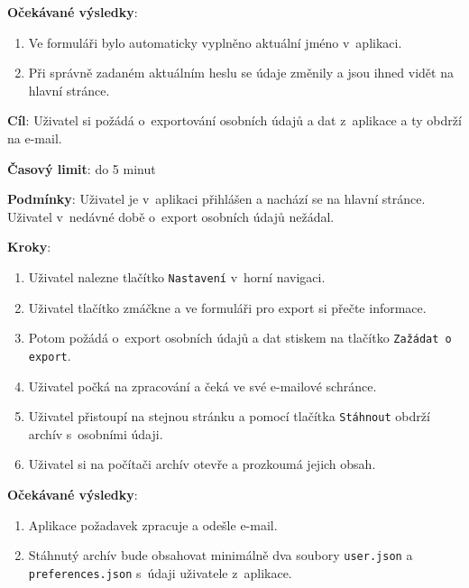 \textbf{Očekávané výsledky}:

\begin{enumerate}[leftmargin=1.4cm]
    \item Ve formuláři bylo automaticky vyplněno aktuální jméno v~aplikaci.
    \item Při správně zadaném aktuálním heslu se údaje změnily a jsou ihned vidět na hlavní stránce.
\end{enumerate}





\vspace{1em}

\textbf{Cíl}: Uživatel si požádá o~exportování osobních údajů a dat z~aplikace a ty obdrží na e-mail.

\textbf{Časový limit}: do 5 minut

\textbf{Podmínky}: Uživatel je v~aplikaci přihlášen a nachází se na hlavní stránce. Uživatel v~nedávné době o~export osobních údajů nežádal.

\textbf{Kroky}:

\begin{enumerate}[leftmargin=1.4cm]
    \item Uživatel nalezne tlačítko \verb|Nastavení| v~horní navigaci.
    \item Uživatel tlačítko zmáčkne a ve formuláři pro export si přečte informace.
    \item Potom požádá o~export osobních údajů a dat stiskem na tlačítko \verb|Zažádat o export|.
    \item Uživatel počká na zpracování a čeká ve své e-mailové schránce.
    \item Uživatel přistoupí na stejnou stránku a pomocí tlačítka \verb|Stáhnout| obdrží archív s~osobními údaji.
    \item Uživatel si na počítači archív otevře a prozkoumá jejich obsah.
\end{enumerate}

\textbf{Očekávané výsledky}:

\begin{enumerate}[leftmargin=1.4cm]
    \item Aplikace požadavek zpracuje a odešle e-mail.
    \item Stáhnutý archív bude obsahovat minimálně dva soubory  \verb|user.json| a \verb|preferences.json| s~údaji uživatele z~aplikace.
\end{enumerate}


